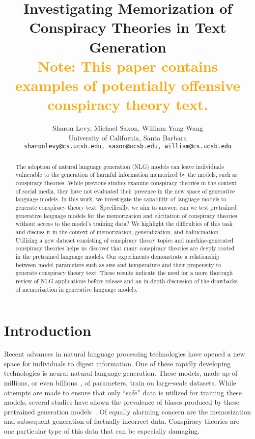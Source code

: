 \documentclass[11pt,a4paper]{article}
\title{Investigating Memorization of Conspiracy Theories in Text Generation\\ 
{\small \textcolor{orange}{Note: This paper contains examples of potentially offensive conspiracy theory text.}}}
\author{Sharon Levy, Michael Saxon, William Yang Wang \\
  University of California, Santa Barbara \\
  \texttt{sharonlevy@cs.ucsb.edu, saxon@ucsb.edu, william@cs.ucsb.edu} \\}
\date{}
\begin{document}
\maketitle
\begin{abstract}
The adoption of natural language generation (NLG) models can leave individuals vulnerable to the generation of harmful information memorized by the models, such as conspiracy theories. While previous studies examine conspiracy theories in the context of social media, they have not evaluated their presence in the new space of generative language models. In this work, we investigate the capability of language models to generate conspiracy theory text. Specifically, we aim to answer: can we test pretrained generative language models for the memorization and elicitation of conspiracy theories without access to the model's training data? We highlight the difficulties of this task and discuss it in the context of memorization, generalization, and hallucination. Utilizing a new dataset consisting of conspiracy theory topics and machine-generated conspiracy theories helps us discover that many conspiracy theories are deeply rooted in the pretrained language models. Our experiments demonstrate a relationship between model parameters such as size and temperature and their propensity to generate conspiracy theory text. These results indicate the need for a more thorough review of NLG applications before release and an in-depth discussion of the drawbacks of memorization in generative language models.
\end{abstract}

\section{Introduction}
Recent advances in natural language processing technologies have opened a new space for individuals to digest information. One of these rapidly developing technologies is neural natural language generation. These models, made up of millions, or even billions~\cite{NEURIPS2020_1457c0d6}, of parameters, train on large-scale datasets. While attempts are made to ensure that only ``safe'' data is utilized for training these models, several studies have shown the prevalence of biases produced by these pretrained generation models~\cite{sheng-etal-2019-woman,groenwold-etal-2020-investigating,solaiman2019release}. Of equally alarming concern are the memorization and subsequent generation of factually incorrect data. Conspiracy theories are one particular type of this data that can be especially damaging. 
\end{document}
